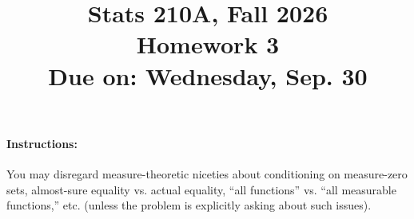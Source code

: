 \documentclass{article}
\theoremstyle{definition}
\begin{document}
\title{Stats 210A, Fall 2026\\
  Homework 3 \\
  {\large {\bf Due on}: Wednesday, Sep. 30}}
\date{}

\maketitle

\paragraph{Instructions:} You may disregard measure-theoretic niceties about conditioning on measure-zero sets, almost-sure equality vs. actual equality, ``all functions'' vs. ``all measurable functions,'' etc. (unless the problem is explicitly asking about such issues).
\end{document}
